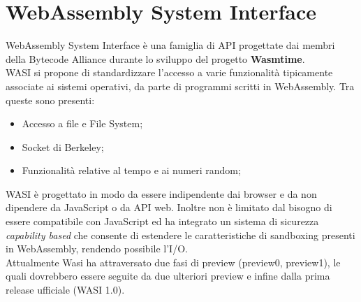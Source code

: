 \section{WebAssembly System Interface}
\label{sec:WASI}
WebAssembly System Interface è una famiglia di API progettate dai membri della Bytecode Alliance durante lo sviluppo del progetto \textbf{Wasmtime}.\cite*{wasiHome}
\\WASI si propone di standardizzare l'accesso a varie funzionalità tipicamente associate ai sistemi operativi, da parte di programmi scritti in WebAssembly. Tra queste sono presenti:
\begin{itemize}
        \item Accesso a file e File System;
        \item Socket di Berkeley;
        \item Funzionalità relative al tempo e ai numeri random;
\end{itemize}
WASI è progettato in modo da essere indipendente dai browser e da non dipendere da JavaScript o da API web. Inoltre non è limitato dal bisogno di essere compatibile con JavaScript ed ha integrato un sistema di sicurezza \emph{capability based} che consente di estendere le caratteristiche di sandboxing presenti in WebAssembly, rendendo possibile l'I/O.
\\Attualmente Wasi ha attraversato due fasi di preview (preview0, preview1), le quali dovrebbero essere seguite da due ulteriori preview e infine dalla prima release ufficiale (WASI 1.0).
